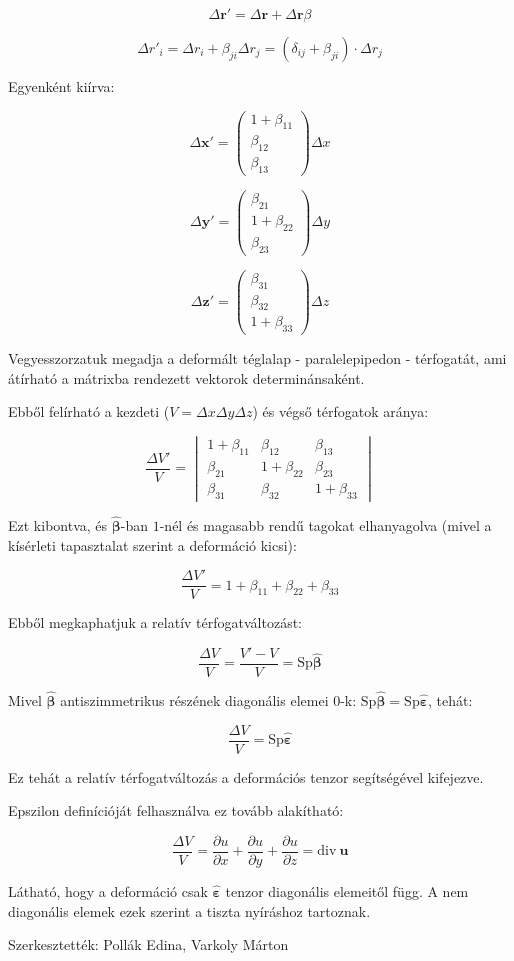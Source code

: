 \documentclass[a4paper, 12pt]{article}
\begin{document}
$$\Delta\mathbf{r'}=\Delta\mathbf{r}+\Delta \mathbf{r} \beta$$

$$\Delta r'_i=\Delta r_i+\beta_{ji}\Delta r_j=(\delta_{ij}+\beta_{ji})\cdot \Delta r_j$$

Egyenként kiírva:

$$\Delta\mathbf{x'}= \left( \begin{array}{c} 1+\beta_{11}\\\beta_{12}\\ \beta_{13}\end{array}\right)\Delta x$$

$$\Delta\mathbf{y'}= \left( \begin{array}{c} \beta_{21}\\1+\beta_{22}\\ \beta_{23}\end{array}\right)\Delta y$$

$$\Delta\mathbf{z'}= \left( \begin{array}{c} \beta_{31}\\\beta_{32}\\ 1+\beta_{33}\end{array}\right)\Delta z$$

Vegyesszorzatuk megadja a deformált téglalap - paralelepipedon - térfogatát, ami átírható a mátrixba rendezett vektorok determinánsaként. 

Ebből felírható a kezdeti ($V=\Delta x\Delta y\Delta z$) és végső térfogatok aránya:

 $$\frac{\Delta V'}{V}=\begin{vmatrix}
1+\beta_{11} & \beta_{12} & \beta_{13} \\ 
\beta_{21} & 1+\beta_{22} & \beta_{23}\\ 
\beta_{31} & \beta_{32} & 1+\beta_{33} 
\end{vmatrix}$$

Ezt kibontva, és $\mathbf{\hat\beta}$-ban $1$-nél és magasabb rendű tagokat elhanyagolva (mivel a kísérleti tapasztalat szerint a deformáció kicsi):

$$\frac{\Delta V'}{V}=1+\beta_{11}+\beta_{22}+\beta_{33}$$

Ebből megkaphatjuk a relatív térfogatváltozást:

$$\frac{\Delta V}{V}=\frac{V'-V}{V}=\mathrm{Sp} \mathbf{\hat\beta}$$

Mivel $\mathbf{\hat\beta}$ antiszimmetrikus részének diagonális elemei $0$-k: $\mathrm{Sp} \mathbf{\hat\beta}=\mathrm{Sp} \mathbf{\hat\varepsilon}$, tehát:

$$\frac{\Delta V}{V}=\mathrm{Sp} \mathbf{\hat\varepsilon}$$

Ez tehát a relatív térfogatváltozás a deformációs tenzor segítségével kifejezve.

Epszilon definícióját felhasználva ez tovább alakítható:

$$\frac{\Delta V}{V}=\frac{\partial u}{\partial x}+\frac{\partial u}{\partial y}+\frac{\partial u}{\partial z}=\mathrm{div}~\mathbf{u}$$

Látható, hogy a deformáció csak $\mathbf{\hat\varepsilon}$ tenzor diagonális elemeitől függ. A nem diagonális elemek ezek szerint a tiszta nyíráshoz tartoznak.

Szerkesztették: Pollák Edina, Varkoly Márton
\end{document}
